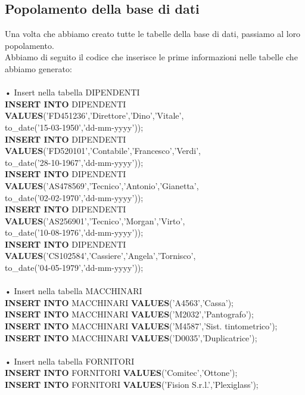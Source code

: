 \documentclass[a4paper,12pt,italian]{article}
\begin{document}
\subsection{Popolamento della base di dati}

Una volta che abbiamo creato tutte le tabelle della base di dati, passiamo al loro popolamento. \\
Abbiamo di seguito il codice che inserisce le prime informazioni nelle tabelle che abbiamo generato: \\ \\
• Insert nella tabella DIPENDENTI \\
\textbf{INSERT INTO} DIPENDENTI \textbf{VALUES}('FD451236','Direttore','Dino','Vitale',\\to\_date('15-03-1950','dd-mm-yyyy')); \\
\textbf{INSERT INTO} DIPENDENTI \textbf{VALUES}('FD520101','Contabile','Francesco','Verdi',\\to\_date('28-10-1967','dd-mm-yyyy')); \\
\textbf{INSERT INTO} DIPENDENTI \textbf{VALUES}('AS478569','Tecnico','Antonio','Gianetta',\\to\_date('02-02-1970','dd-mm-yyyy')); \\
\textbf{INSERT INTO} DIPENDENTI \textbf{VALUES}('AS256901','Tecnico','Morgan','Virto',\\to\_date('10-08-1976','dd-mm-yyyy')); \\
\textbf{INSERT INTO} DIPENDENTI \textbf{VALUES}('CS102584','Cassiere','Angela','Tornisco',\\to\_date('04-05-1979','dd-mm-yyyy')); \\ \\
• Insert nella tabella MACCHINARI \\
\textbf{INSERT INTO} MACCHINARI \textbf{VALUES}('A4563','Cassa'); \\
\textbf{INSERT INTO} MACCHINARI \textbf{VALUES}('M2032','Pantografo'); \\
\textbf{INSERT INTO} MACCHINARI \textbf{VALUES}('M4587','Sist. tintometrico'); \\
\textbf{INSERT INTO} MACCHINARI \textbf{VALUES}('D0035','Duplicatrice'); \\ \\
• Insert nella tabella FORNITORI \\
\textbf{INSERT INTO} FORNITORI \textbf{VALUES}('Comitec','Ottone'); \\
\textbf{INSERT INTO} FORNITORI \textbf{VALUES}('Fision S.r.l.','Plexiglass'); \\
\end{document}
